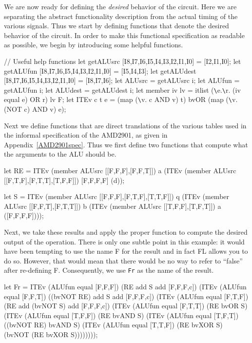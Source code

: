 We are now ready for defining the {\em desired} behavior of the circuit.
Here we are separating the abstract functionality%
%
{} description from
the actual timing of the various signals.
Thus we start by defining functions that denote the desired behavior
of the circuit.
In order to make this functional specification as readable as possible,
we begin by introducing some helpful functions.
\begin{hol}
// Useful help functions
let getALUsrc  [I8,I7,I6,I5,I4,I3,I2,I1,I0] = [I2,I1,I0];
let getALUfun  [I8,I7,I6,I5,I4,I3,I2,I1,I0] = [I5,I4,I3];
let getALUdest [I8,I7,I6,I5,I4,I3,I2,I1,I0] = [I8,I7,I6];
let ALUsrc = getALUsrc i;
let ALUfun = getALUfun i;
let ALUdest = getALUdest i;
let member iv lv = itlist (\verb!\!e.\verb!\!r. (iv equal e) OR r) lv F;
let ITEv c t e = (map (\verb!\!v. c AND v) t) bvOR (map (\verb!\!v. (NOT c) AND v) e);
\end{hol}
Next we define functions that are direct translations of the
various tables used in the informal specification of the AMD2901, 
as given in Appendix~\ref{AMD2901spec}.
Thus we first define two functions that compute what the arguments
to the ALU should be.
\begin{hol}
let RE = ITEv (member ALUsrc [[F,F,F],[F,F,T]]) a
        (ITEv (member ALUsrc [[F,T,F],[F,T,T],[T,F,F]]) [F,F,F,F]
        (d));

let S  = ITEv (member ALUsrc [[F,F,F],[F,T,F],[T,T,F]]) q
        (ITEv (member ALUsrc [[F,F,T],[F,T,T]]) b
        (ITEv (member ALUsrc [[T,F,F],[T,F,T]]) a
        ([F,F,F,F])));
\end{hol}
Next, we take these results and apply the proper function to
compute the desired output of the operation.
There is only one subtle point in this example: it would have been
tempting to use the name F for the result and in fact FL allows you to do so.
However, that would mean that there would be no way to refer to ``false''
after re-defining F.
Consequently, we use {\tt Fr} as the name of the result.
\begin{hol}
let Fr = ITEv (ALUfun equal [F,F,F]) (RE add S add [F,F,F,c])
        (ITEv (ALUfun equal [F,F,T]) ((bvNOT RE) add S add [F,F,F,c])
        (ITEv (ALUfun equal [F,T,F]) (RE add (bvNOT S) add [F,F,F,c])
        (ITEv (ALUfun equal [F,T,T]) (RE bvOR S)
        (ITEv (ALUfun equal [T,F,F]) (RE bvAND S)
        (ITEv (ALUfun equal [T,F,T]) ((bvNOT RE) bvAND S)
        (ITEv (ALUfun equal [T,T,F]) (RE bvXOR S)
        (bvNOT (RE bvXOR S))))))));
\end{hol}

